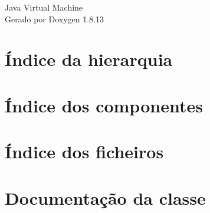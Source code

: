 \documentclass[twoside]{book}
\newcommand{\+}{\discretionary{\mbox{\scriptsize$\hookleftarrow$}}{}{}}
\newcommand{\clearemptydoublepage}{%
  \newpage{\pagestyle{empty}\cleardoublepage}%
}
\begin{document}
\hypersetup{pageanchor=false,
             bookmarksnumbered=true,
             pdfencoding=unicode
            }
\begin{titlepage}
\vspace*{7cm}
\begin{center}%
{\Large Java Virtual Machine }\\
\vspace*{1cm}
{\large Gerado por Doxygen 1.8.13}\\
\end{center}
\end{titlepage}
\clearemptydoublepage
{}
\tableofcontents
\clearemptydoublepage
{}
\hypersetup{pageanchor=true}

\chapter{Índice da hierarquia}

\chapter{Índice dos componentes}

\chapter{Índice dos ficheiros}

\chapter{Documentação da classe}











































\end{document}

